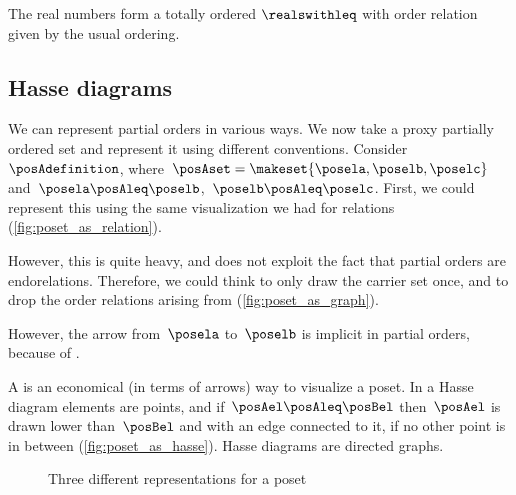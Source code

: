 
\begin{example}[Reals]
    The real numbers \reals form a totally ordered  $\realswithleq$ with order relation given by the usual ordering.
\end{example}
\vfill
\clearpage

\subsection{Hasse diagrams}
We can represent partial orders in various ways.
We now take a proxy partially ordered set and represent it using different conventions.
Consider~$\posAdefinition$, where~$\posAset=\makeset{\posela,\poselb,\poselc}$ and~$\posela\posAleq \poselb$,~$\poselb\posAleq \poselc$.
First, we could represent this using the same visualization we had for relations (\cref{fig:poset_as_relation}).

However, this is quite heavy, and does not exploit the fact that partial orders are endorelations.
Therefore, we could think to only draw the carrier set once, and to drop the order relations arising from  (\cref{fig:poset_as_graph}).

However, the arrow from~$\posela$ to~$\poselb$ is implicit in partial orders, because of .

\label{sec:hasse-diagram}
A  is an economical (in terms of arrows) way to visualize a poset.
In a Hasse diagram elements are points, and if~$\posAel \posAleq \posBel$ then~$\posAel$ is drawn lower than~$\posBel$ and with an edge connected to it, if no other point is in between (\cref{fig:poset_as_hasse}).
Hasse diagrams are directed graphs.

\begin{figure*}[h!]
    \hspace{4em}
    \hspace{4em}
    \hspace{4em}
    \caption{Three different representations for a poset}
    \label{fig:poset_representation}
\end{figure*}


